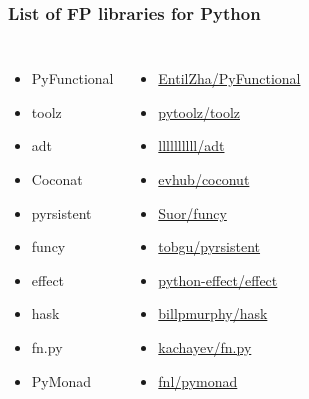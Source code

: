 \documentclass[18pt, compress]{beamer}
\begin{document}
\fontsize{14pt}{15}\selectfont
\begin{frame}
    \frametitle{List of FP libraries for Python}
    \vspace{-35pt}
    \begin{columns}[T,onlytextwidth]
        \begin{itemize}[label={\MVRightarrow}]
            \item PyFunctional
            \item toolz
            \item adt
            \item Coconat
            \item pyrsistent
            \item funcy
            \item effect
            \item hask
            \item fn.py
            \item PyMonad
        \end{itemize}

        \begin{itemize}[label={}]
            \item \href{github.com/EntilZha/PyFunctional}{EntilZha/PyFunctional}
            \item \href{github.com/pytoolz/toolz}{pytoolz/toolz}
            \item \href{github.com/llllllllll/adt}{llllllllll/adt}
            \item \href{github.com/evhub/coconut}{evhub/coconut}
            \item \href{github.com/Suor/funcy}{Suor/funcy}
            \item \href{github.com/tobgu/pyrsistent}{tobgu/pyrsistent}
            \item \href{github.com/python-effect/effect}{python-effect/effect}
            \item \href{github.com/billpmurphy/hask}{billpmurphy/hask}
            \item \href{github.com/kachayev/fn.py}{kachayev/fn.py}
            \item \href{github.com/fnl/pymonad}{fnl/pymonad}
        \end{itemize}

    \end{columns}
\end{frame}
\fontsize{17pt}{18}\selectfont
\end{document}

